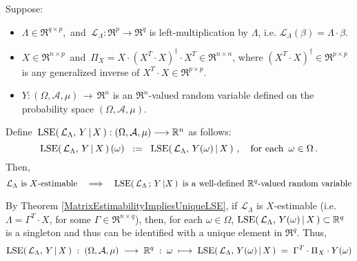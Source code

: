 \vskip 0.5cm
\begin{theorem}
\label{LSEofEstimableFunctionsAreRandomVariables}
\noindent
Suppose:
\begin{itemize}
\item
	$\Lambda \in \Re^{q \times p}$,\,
	and
	\,$\mathcal{L}_{\Lambda} : \Re^{p} \longrightarrow \Re^{q}$ is left-multiplication by $\Lambda$,
	i.e. $\mathcal{L}_{\Lambda}(\beta) = \Lambda \cdot \beta$.
\item
	$X \in \Re^{n \times p}$\, and \,$\Pi_{X} = X\cdot(X^{T}\cdot X)^{\dagger}\cdot X^{T} \in \Re^{n \times n}$,
	where $(X^{T}\cdot X)^{\dagger} \in \Re^{p \times p}$ is any generalized inverse of
	$X^{T}\cdot X \in \Re^{p \times p}$.
\item
	$Y : (\Omega,\mathcal{A},\mu) \,\longrightarrow\, \Re^{n}$ is an $\Re^{n}$-valued
	random variable defined on the probability space $(\Omega,\mathcal{A},\mu)$.
\end{itemize}
Define \,$\textnormal{LSE}\!\left(\,\mathcal{L}_{\Lambda},\,Y\,\vert\,X\,\right) : (\Omega,\mathcal{A},\mu) \longrightarrow \mathbb{R}^{n}$
as follows:
\begin{equation*}
\textnormal{LSE}\!\left(\,\mathcal{L}_{\Lambda},\,Y\,\vert\,X\,\right)(\omega)
\;\; := \;\; \textnormal{LSE}\!\left(\,\mathcal{L}_{\Lambda},\,Y(\omega)\,\vert\,X\,\right)\,,
\quad
\textnormal{for each \,$\omega \in \Omega$}\,.
\end{equation*}
Then,
\begin{equation*}
\textnormal{$\mathcal{L}_{\Lambda}$ is $X$-estimable}
\quad\Longrightarrow\quad
\textnormal{$\textnormal{LSE}\!\left(\,\mathcal{L}_{\Lambda} \,;\, Y\,\vert X\,\right)$\,
is a well-defined $\mathbb{R}^{q}$-valued random variable}
\end{equation*}
\end{theorem}
\proof
By Theorem \ref{MatrixEstimabilityImpliesUniqueLSE},
if $\mathcal{L}_{\Lambda}$ is $X$-estimable (i.e. $\Lambda = \Gamma^{T} \cdot X$,
for some $\Gamma \in \Re^{n \times q}$), then, for each $\omega \in \Omega$,
$\textnormal{LSE}\!\left(\,\mathcal{L}_{\Lambda},\,Y(\omega)\,\vert\,X\,\right) \subset \mathbb{R}^{q}$
is a singleton and thus can be identified with a unique element in $\Re^{q}$.
Thus,
\begin{equation*}
\textnormal{LSE}\!\left(\,\mathcal{L}_{\Lambda},\,Y\,\vert\,X\,\right)
\;:\; (\Omega,\mathcal{A},\mu) \; \longrightarrow \; \mathbb{R}^{q}
\;:\; \omega \; \longmapsto \; \textnormal{LSE}\!\left(\,\mathcal{L}_{\Lambda},\,Y(\omega)\,\vert\,X\,\right)
\;=\; \Gamma^{T} \cdot \Pi_{X} \cdot Y(\omega)
\end{equation*}
